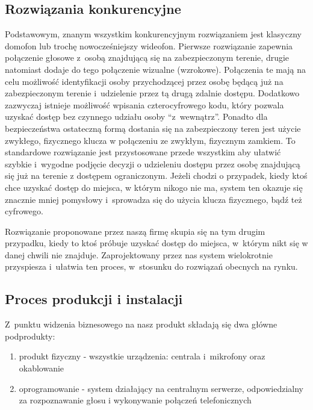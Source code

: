 \documentclass[../main.tex]{subfiles}
\begin{document}
{    \subsection{Rozwiązania konkurencyjne}
    \label{chapter1:opis_produktu:rozw_konkurencyjne} {
        Podstawowym, znanym wszystkim konkurencyjnym rozwiązaniem jest klasyczny
        domofon lub trochę nowocześniejszy wideofon. Pierwsze rozwiązanie zapewnia
        połączenie głosowe z~osobą znajdującą się na zabezpieczonym terenie, drugie
        natomiast dodaje do tego połączenie wizualne (wzrokowe). Połączenia te mają na
        celu możliwość identyfikacji osoby przychodzącej przez osobę będącą już na
        zabezpieczonym terenie i~udzielenie przez tą drugą zdalnie dostępu. Dodatkowo
        zazwyczaj istnieje możliwość wpisania czterocyfrowego kodu, który pozwala
        uzyskać dostęp bez czynnego udziału osoby “z~wewnątrz”. Ponadto dla
        bezpieczeństwa ostateczną formą dostania się na zabezpieczony teren jest użycie
        zwykłego, fizycznego klucza w połączeniu ze zwykłym, fizycznym zamkiem. To
        standardowe rozwiązanie jest przystosowane przede wszystkim aby ułatwić szybkie
        i~wygodne podjęcie decyzji o udzieleniu dostępu przez osobę znajdującą się już
        na terenie z dostępem ograniczonym. Jeżeli chodzi o przypadek, kiedy ktoś chce
        uzyskać dostęp do miejsca, w którym nikogo nie ma, system ten okazuje się
        znacznie mniej pomysłowy i~sprowadza się do użycia klucza fizycznego, bądź też
        cyfrowego.

        Rozwiązanie proponowane przez naszą firmę skupia się na tym drugim przypadku,
        kiedy to ktoś próbuje uzyskać dostęp do miejsca, w~którym nikt się w danej
        chwili nie znajduje. Zaprojektowany przez nas system wielokrotnie przyspiesza
        i~ułatwia ten proces, w~stosunku do rozwiązań obecnych na rynku.
    }

    \subsection{Proces produkcji i instalacji}
    \label{chapter1:opis_produktu:produkcja} {
        Z~punktu widzenia biznesowego na nasz produkt składają się dwa główne podprodukty:
        \begin{enumerate}
            \item produkt fizyczny - wszystkie urządzenia: centrala i~mikrofony oraz
            okablowanie
            \item oprogramowanie - system działający na centralnym serwerze,
            odpowiedzialny za rozpoznawanie głosu i wykonywanie połączeń telefonicznych
        \end{enumerate}

}}
\end{document}
